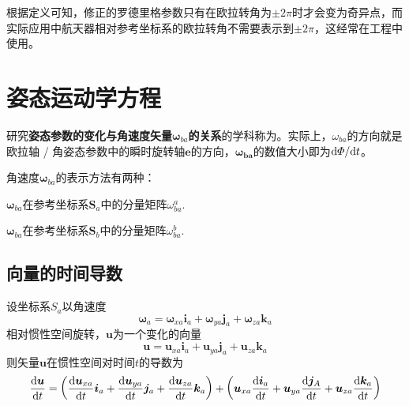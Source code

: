 根据定义可知，修正的罗德里格参数只有在欧拉转角为$\pm 2 \pi$时才会变为奇异点，而实际应用中航天器相对参考坐标系的欧拉转角不需要表示到$\pm 2 \pi$，这经常在工程中使用。




\section{姿态运动学方程}

研究\textbf{姿态参数的变化与角速度矢量$\bm{\omega}_{ba}$的关系}的学科称为。实际上，$\omega_{ba}$的方向就是欧拉轴 / 角姿态参数中的瞬时旋转轴$\bm{e}$的方向，$\bm{\omega_{ba}}$的数值大小即为${\rm{d}} \varPhi / {\rm{d}} t$。

角速度$\bm{\omega}_{ba}$的表示方法有两种：

\noa[1] $\bm{\omega}_{ba}$在参考坐标系$\bm{S}_a$中的分量矩阵$\omega_{ba}^a$.

\noa[2] $\bm{\omega}_{ba}$在参考坐标系$\bm{S}_b$中的分量矩阵$\omega_{ba}^b$.
\vspace*{0.5em}

\subsection{向量的时间导数}
设坐标系$S_a$以角速度
\begin{equation}
	\bm{\omega}_a = \bm{\omega}_{xa} \bm{i}_a + \bm{\omega}_{ya} \bm{j}_a + \bm{\omega}_{za} \bm{k}_a 
\end{equation}
相对惯性空间旋转，$\bm{u}$为一个变化的向量
\begin{equation*}
	\bm{u} = \bm{u}_{xa} \bm{i}_a + \bm{u}_{ya} \bm{j}_a + \bm{u}_{za} \bm{k}_a
\end{equation*}
则矢量$\bm{u}$在惯性空间对时间$t$的导数为
\begin{equation}
	\dfrac{{\rm{d}} \bm{u}}{{\rm{d}} t} = \left( \dfrac{{\rm{d}} \bm{u}_{xa}}{{\rm{d}} t}\bm{i}_a + \dfrac{{\rm{d}} \bm{u}_{ya}}{{\rm{d}} t} \bm{j}_a + \dfrac{{\rm{d}} \bm{u}_{za}}{{\rm{d}} t} \bm{k}_a \right) + \left(\bm{u}_{xa} \dfrac{{\rm{d}} \bm{i}_a}{{\rm{d}} t} + \bm{u}_{ya} \dfrac{{\rm{d}} \bm{j}_A}{{\rm{d}} t} + \bm{u}_{za} \dfrac{{\rm{d}} \bm{k}_a}{{\rm{d}} t}\right)
\end{equation}
\vspace*{0.1em}

